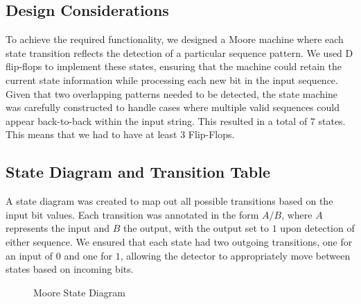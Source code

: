 \documentclass[12pt]{article}
\begin{document}
\subsection*{Design Considerations}
To achieve the required functionality, we designed a Moore machine where each state transition reflects the detection of a particular sequence pattern. We used D flip-flops to implement these states, ensuring that the machine could retain the current state information while processing each new bit in the input sequence. Given that two overlapping patterns needed to be detected, the state machine was carefully constructed to handle cases where multiple valid sequences could appear back-to-back within the input string. This resulted in a total of 7 states. This means that we had to have at least 3 Flip-Flops.

\subsection*{State Diagram and Transition Table}
A state diagram was created to map out all possible transitions based on the input bit values. Each transition was annotated in the form \( A/B \), where \( A \) represents the input and \( B \) the output, with the output set to \( 1 \) upon detection of either sequence. We ensured that each state had two outgoing transitions, one for an input of \( 0 \) and one for \( 1 \), allowing the detector to appropriately move between states based on incoming bits.
\begin{figure}[H]
	\caption{Moore State Diagram}
\end{figure}
\end{document}
